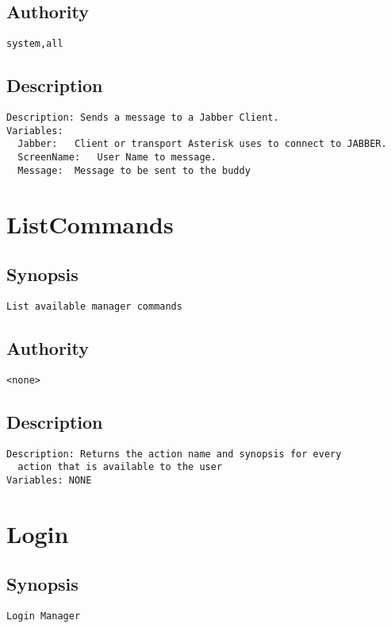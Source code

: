 \subsection{Authority}
\begin{verbatim}
system,all
\end{verbatim}
\subsection{Description}
\begin{verbatim}
Description: Sends a message to a Jabber Client.
Variables: 
  Jabber:	Client or transport Asterisk uses to connect to JABBER.
  ScreenName:	User Name to message.
  Message:	Message to be sent to the buddy

\end{verbatim}


\section{ListCommands}
\subsection{Synopsis}
\begin{verbatim}
List available manager commands
\end{verbatim}
\subsection{Authority}
\begin{verbatim}
<none>
\end{verbatim}
\subsection{Description}
\begin{verbatim}
Description: Returns the action name and synopsis for every
  action that is available to the user
Variables: NONE

\end{verbatim}


\section{Login}
\subsection{Synopsis}
\begin{verbatim}
Login Manager
\end{verbatim}
